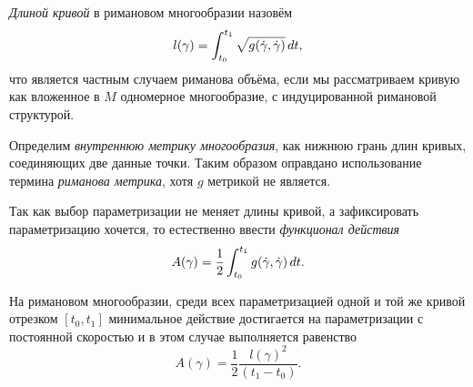 \begin{to_def} 
    \textit{Длиной кривой} в римановом многообразии назовём
\begin{equation*}
     l(\gamma) = \int_{t_0}^{t_1} \sqrt{g(\dot{\gamma}, \dot{\gamma})}
     \, d t,
 \end{equation*} 
  что является частным случаем риманова объёма, если мы рассматриваем кривую как вложенное в $M$ одномерное многообразие, с индуцированной римановой структурой.
\end{to_def}

\begin{to_def} 
    Определим \textit{внутреннюю метрику многообразия}, как нижнюю грань длин кривых, соединяющих две данные точки. Таким образом оправдано использование термина \textit{риманова метрика}, хотя $g$ метрикой не является.
\end{to_def}

\begin{to_def} 
    Так как выбор параметризации не меняет длины кривой, а зафиксировать параметризацию хочется, то естественно ввести \textit{функционал действия}
    \begin{equation*}
         A(\gamma) = \frac{1}{2} \int_{t_0}^{t_1} g(\dot{\gamma}, \dot{\gamma}) \, d t.
     \end{equation*} 
\end{to_def}



\begin{to_thr} 
    На римановом многообразии, среди всех параметризацией одной и той же кривой отрезком $[t_0, t_1]$ минимальное действие достигается на параметризации с постоянной скоростью и в этом случае выполняется равенство
    \begin{equation*}
         A(\gamma) = \frac{1}{2} \frac{l(\gamma)^2}{(t_1 - t_0)}.
     \end{equation*} 
\end{to_thr}
